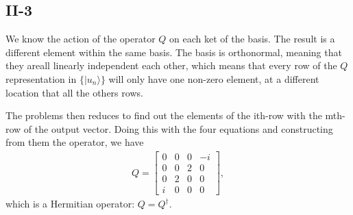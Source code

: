 \documentclass[letterpaper,11pt,twoside]{article}
\newcommand{\ket}[1]{|#1\rangle}
\begin{document}
\subsection*{II-3}
We know the action of the operator $Q$ on each ket of the basis. The result is a different element within the same basis. The basis is orthonormal, meaning that 
they areall linearly independent each other, which means that every row of the $Q$ representation in $\{\ket{u_n}\}$ will only have one non-zero element, at a different 
location that all the others rows.

The problems then reduces to find out the elements of the ith-row with the mth-row of the output vector. Doing this with the four equations and constructing from them 
the operator, we have
\begin{align*}
  Q=\begin{bmatrix}
    0&0&0&-i\\
    0&0&2&0\\
    0&2&0&0\\
    i&0&0&0
  \end{bmatrix},
\end{align*}
which is a Hermitian operator: $Q=Q^\dagger$.


%
\end{document}
